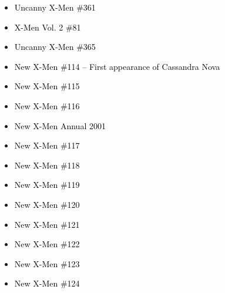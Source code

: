 \documentclass[12pt]{article}
\newcommand{\checkbox}{\raisebox{0.0ex}{\fbox{\rule{0ex}{1.5ex} \rule{1.5ex}{0ex}}}}
\begin{document}
\vspace{0.3cm}
\noindent
\begin{tcolorbox}[
  colback=white!95!gray,
  colframe=black,
  width=\textwidth,
  arc=4mm,
  auto outer arc,
  boxrule=0.8pt,
  left=8pt,right=8pt,top=8pt,bottom=8pt
]
\begin{itemize}[left=0pt,label={\checkbox}]
  \item \textcolor{black}{Uncanny X-Men \#361}
  \item \textcolor{black}{X-Men Vol. 2 \#81}
  \item \textcolor{black}{Uncanny X-Men \#365}
  \item \textcolor{black}{New X-Men \#114 – First appearance of Cassandra Nova}
  \item \textcolor{black}{New X-Men \#115}
  \item \textcolor{black}{New X-Men \#116}
  \item \textcolor{black}{New X-Men Annual 2001}
  \item \textcolor{black}{New X-Men \#117}
  \item \textcolor{black}{New X-Men \#118}
  \item \textcolor{black}{New X-Men \#119}
  \item \textcolor{black}{New X-Men \#120}
  \item \textcolor{black}{New X-Men \#121}
  \item \textcolor{black}{New X-Men \#122}
  \item \textcolor{black}{New X-Men \#123}
  \item \textcolor{black}{New X-Men \#124}
\end{itemize}
\end{tcolorbox}

\newpage
{}
\end{document}

